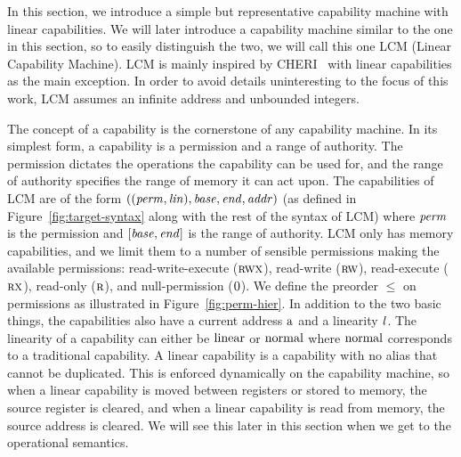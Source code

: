 \documentclass[acmsmall,review,anonymous]{acmart}\settopmatter{printfolios=true,printccs=false,printacmref=false}
\newcommand{\trgcm}{\textsc{LCM}}
\begin{document}
In this section, we introduce a simple but representative capability machine with linear capabilities.
We will later introduce a capability machine similar to the one in this section, so to easily distinguish the two, we will call this one \trgcm{} (Linear Capability Machine).
\trgcm{} is mainly inspired by CHERI~\citep{watson_cheri:_2015} with linear capabilities as the main exception.
In order to avoid details uninteresting to the focus of this work, \trgcm{} assumes an infinite address and unbounded integers.

The concept of a capability is the cornerstone of any capability machine.
In its simplest form, a capability is a permission and a range of authority.
The permission dictates the operations the capability can be used for, and the range of authority specifies the range of memory it can act upon.
The capabilities of \trgcm{} are of the form $((\mathit{perm},\mathit{lin}),\mathit{base},\mathit{end},\mathit{addr})$ (as defined in Figure~\ref{fig:target-syntax} along with the rest of the syntax of \trgcm{}) where $\mathit{perm}$ is the permission and $[\mathit{base},\mathit{end}]$ is the range of authority.
\trgcm{} only has memory capabilities, and we limit them to a number of sensible permissions making the available permissions: read-write-execute ($\textsc{rwx}$), read-write ($\textsc{rw}$), read-execute ($\textsc{rx}$), read-only ($\textsc{r}$), and null-permission ($\textsc{0}$).
We define the preorder $\le$ on permissions as illustrated in Figure~\ref{fig:perm-hier}.
In addition to the two basic things, the capabilities also have a current address $\mathrm{a}$ and a linearity $\mathit{l}$. The linearity of a capability can either be $\mathrm{linear}$ or $\mathrm{normal}$ where $\mathrm{normal}$ corresponds to a traditional capability.
A linear capability is a capability with no alias that cannot be duplicated.
This is enforced dynamically on the capability machine, so when a linear capability is moved between registers or stored to memory, the source register is cleared, and when a linear capability is read from memory, the source address is cleared. We will see this later in this section when we get to the operational semantics.
\end{document}
